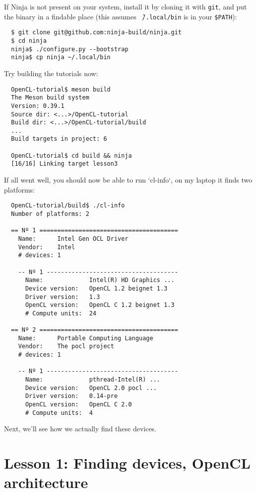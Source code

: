 \documentclass{article}
\begin{document}
  If Ninja is not present on your system, install it by cloning it with {\tt git}, and put the binary in a findable place (this assumes {\tt \~\ /.local/bin} is in your {\tt \$PATH}):

  \begin{verbatim}
  $ git clone git@github.com:ninja-build/ninja.git
  $ cd ninja
  ninja$ ./configure.py --bootstrap
  ninja$ cp ninja ~/.local/bin
  \end{verbatim}

  Try building the tutorials now:

  \begin{verbatim}
  OpenCL-tutorial$ meson build
  The Meson build system
  Version: 0.39.1
  Source dir: <...>/OpenCL-tutorial
  Build dir: <...>/OpenCL-tutorial/build
  ...
  Build targets in project: 6

  OpenCL-tutorial$ cd build && ninja
  [16/16] Linking target lesson3
  \end{verbatim}

  If all went well, you should now be able to run `cl-info`, on my laptop it finds two platforms:

  \begin{minipage}{\linewidth}
    \begin{verbatim}
  OpenCL-tutorial/build$ ./cl-info
  Number of platforms: 2

  == Nº 1 =======================================
    Name:      Intel Gen OCL Driver
    Vendor:    Intel
    # devices: 1

    -- Nº 1 -------------------------------------
      Name:             Intel(R) HD Graphics ...
      Device version:   OpenCL 1.2 beignet 1.3
      Driver version:   1.3
      OpenCL version:   OpenCL C 1.2 beignet 1.3
      # Compute units:  24

  == Nº 2 =======================================
    Name:      Portable Computing Language
    Vendor:    The pocl project
    # devices: 1

    -- Nº 1 -------------------------------------
      Name:             pthread-Intel(R) ...
      Device version:   OpenCL 2.0 pocl ...
      Driver version:   0.14-pre
      OpenCL version:   OpenCL C 2.0
      # Compute units:  4
  \end{verbatim}
  \end{minipage}

  Next, we'll see how we actually find these devices.

  \section{Lesson 1: Finding devices, \acs{OpenCL} architecture}
\end{document}
